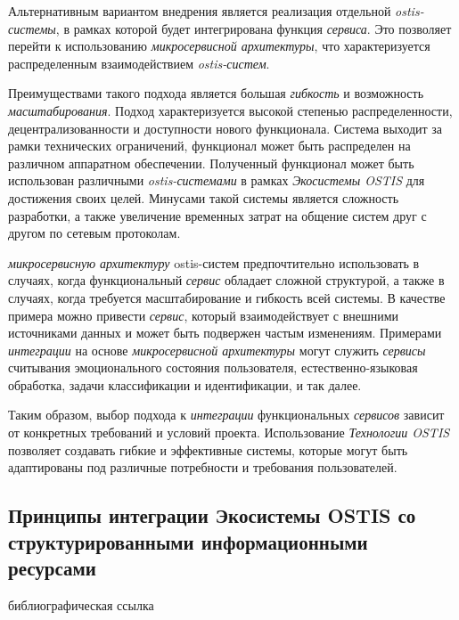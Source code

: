 Альтернативным вариантом внедрения является реализация отдельной \textit{ostis-системы}, в рамках которой будет интегрирована функция \textit{сервиса}. Это позволяет перейти к использованию \textit{микросервисной архитектуры}, что характеризуется распределенным взаимодействием \textit{ostis-систем}.

Преимуществами такого подхода является большая \textit{гибкость} и возможность \textit{масштабирования}. Подход характеризуется высокой степенью распределенности, децентрализованности и доступности нового функционала. Система выходит за рамки технических ограничений, функционал может быть распределен на различном аппаратном обеспечении. Полученный функционал может быть использован различными \textit{ostis-системами} в рамках \textit{Экосистемы OSTIS} для достижения своих целей. Минусами такой системы является сложность разработки, а также увеличение временных затрат на общение систем друг с другом по сетевым протоколам. 

\textit{микросервисную архитектуру} ostis-систем предпочтительно использовать в случаях, когда функциональный \textit{сервис} обладает сложной структурой, а также в случаях, когда требуется масштабирование и гибкость всей системы. В качестве примера можно привести \textit{сервис}, который взаимодействует с внешними источниками данных и может быть подвержен частым изменениям.  Примерами \textit{интеграции} на основе \textit{микросервисной архитектуры} могут служить \textit{сервисы} считывания эмоционального состояния пользователя, естественно-языковая обработка, задачи классификации и идентификации, и так далее.

Таким образом, выбор подхода к \textit{интеграции} функциональных \textit{сервисов} зависит от конкретных требований и условий проекта. Использование \textit{Технологии OSTIS} позволяет создавать гибкие и эффективные системы, которые могут быть адаптированы под различные потребности и требования пользователей.

\subsection{Принципы интеграции Экосистемы OSTIS со структурированными информационными ресурсами}
{\label{sec_integration_resources}} 

\begin{SCn}
\bigskip

\begin{scnrelfromlist}{библиографическая ссылка}
\end{scnrelfromlist}
\end{SCn}

